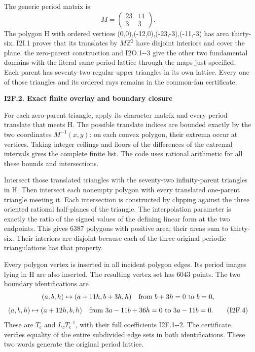 The generic period matrix is
\[
                   M=\begin{pmatrix}23&11\\3&3\end{pmatrix}.
 \tag{I2F.3}
\]
The polygon H with ordered vertices
(0,0),(-12,0),(-23,-3),(-11,-3) has area thirty-six.
I2I.1 proves that its translates by \(M \mathbb Z^{2}\) have
disjoint interiors and cover the plane. the zero-parent construction
and I2O.1-\/-3 give the other two fundamental domains
with the literal same period lattice through the
maps just specified. Each parent has seventy-two regular
upper triangles in its own lattice. Every one of
those triangles and its ordered rays remains in
the common-fan certificate.

\par

\medskip\noindent\textbf{I2F.2. Exact finite overlay and boundary closure}

\par\nobreak

For each zero-parent triangle, apply its character
matrix and every period translate that meets H.
The possible translate indices are bounded exactly
by the two coordinates \(M^{-1}(x,y)\): on each convex
polygon, their extrema occur at vertices. Taking
integer ceilings and floors of the differences of
the extremal intervals gives the complete finite
list. The code uses rational arithmetic for all
these bounds and intersections.

Intersect those translated triangles with the
seventy-two infinity-parent triangles in H. Then
intersect each nonempty polygon with every
translated one-parent triangle meeting it. Each
intersection is constructed by clipping against
the three oriented rational half-planes of the
triangle. The interpolation parameter is exactly
the ratio of the signed values of the defining
linear form at the two endpoints. This gives
6387 polygons with positive area; their areas sum
to thirty-six. Their interiors are disjoint because
each of the three original periodic triangulations
has that property.

Every polygon vertex is inserted in all incident
polygon edges. Its period images lying in H are
also inserted. The resulting vertex set has 6043
points. The two boundary identifications are
\[
 (a,b,h)\mapsto(a+11h,b+3h,h)
 \quad\hbox{from }b+3h=0\hbox{ to }b=0,
\]
\[
 (a,b,h)\mapsto(a+12h,b,h)
 \quad\hbox{from }3a-11b+36h=0
                  \hbox{ to }3a-11b=0.
 \tag{I2F.4}
\]
These are \(T_c\) and \(L_c T_c^{-1}\), with their full
coefficients I2F.1-\/-2. The certificate verifies
equality of the entire subdivided edge sets in
both identifications. These two words generate
the original period lattice.

